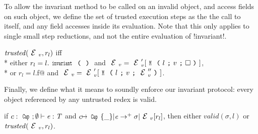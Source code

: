 \noindent 
To allow the invariant method to be called on an invalid object, and access fields on such object, we define the set of trusted execution steps as the the call to \Q@invariant@ itself, and any field accesses inside its evaluation. Note that this only applies to single small step reductions, and not the entire evaluation of \Q!invariant!.

\noindent $\mathit{trusted}(\ctx_v,r_l)$ iff\\*
\indent either
$r_l=l.\invariant$ and
$\ctx_v=\ctx_v'[\M{l}{v}{\square}]$,\\*
\indent or
$r_l=l$\Q@.f@ and
$\ctx_v=\ctx_v'[\M{l}{v}{\ctx_v''}]$.

\noindent Finally, we define what it means to soundly enforce our invariant protocol: every object referenced by any untrusted redex is valid.

\begin{theorem}[Soundness]\rm
if $c:\Kw{Cap};\emptyset\vdash \e: \T$ and
$c\mapsto\Kw{Cap}\{\_\}|\e\rightarrow^+ \sigma|\ctx_v[r_l]$, then
either $\mathit{valid}(\sigma,l)$ or $\mathit{trusted}(\ctx_v,r_l)$.
\end{theorem}


